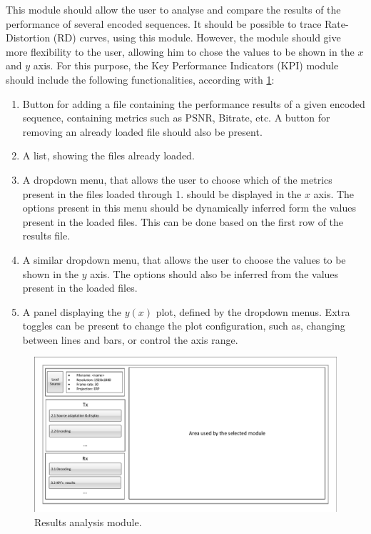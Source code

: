 \documentclass{article}
\begin{document}
This module should allow the user to analyse and compare the results of the performance of several encoded sequences. It should be possible to trace Rate-Distortion (RD) curves, using this module. However, the module should give more flexibility to the user, allowing him to chose the values to be shown in the $x$ and $y$ axis. For this purpose, the Key Performance Indicators (KPI) module should include the following functionalities, according with \cref{fig:results_module}:

\begin{enumerate}
    \item Button for adding a file containing the performance results of a given encoded sequence, containing metrics such as PSNR, Bitrate, etc. A button for removing an already loaded file should also be present.
    \item A list, showing the files already loaded.
    \item A dropdown menu, that allows the user to choose which of the metrics present in the files loaded through 1. should be displayed in the $x$ axis. The options present in this menu should be dynamically inferred form the values present in the loaded files. This can be done based on the first row of the results file.
    \item A similar dropdown menu, that allows the user to choose the values to be shown in the $y$ axis. The options should also be inferred from the values present in the loaded files.
    \item A panel displaying the $y(x)$ plot, defined by the dropdown menus. Extra toggles can be present to change the plot configuration, such as, changing between lines and bars, or control the axis range.
\end{enumerate}

\begin{figure}[htbp]
    \centering
    \includegraphics[page=4,width=1\textwidth]{Drawings.pdf}
    \caption{Results analysis module.}
    \label{fig:results_module}
\end{figure}
\end{document}
